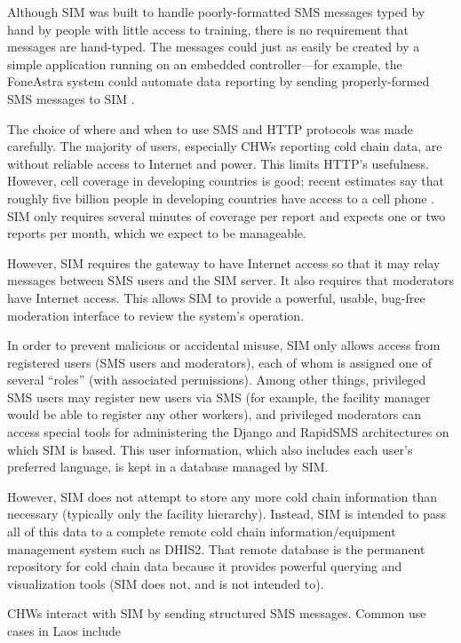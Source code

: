 \documentclass{acm_proc_article-sp}
\begin{document}
Although SIM was built to handle poorly-formatted SMS messages typed by hand by people with little access to training, there is no requirement that messages are hand-typed. The messages could just as easily be created by a simple application running on an embedded controller---for example, the FoneAstra system could automate data reporting by sending properly-formed SMS messages to SIM \cite{foneastra}.

The choice of where and when to use SMS and HTTP protocols was made carefully. The majority of users, especially CHWs reporting cold chain data, are without reliable access to Internet and power. This limits HTTP's usefulness. However, cell coverage in developing countries is good; recent estimates say that roughly five billion people in developing countries have access to a cell phone \cite{worldbank:mobileaccess}. SIM only requires several minutes of coverage per report and expects one or two reports per month, which we expect to be manageable.

However, SIM requires the gateway to have Internet access so that it may relay messages between SMS users and the SIM server. It also requires that moderators have Internet access. This allows SIM to provide a powerful, usable, bug-free moderation interface to review the system's operation.

In order to prevent malicious or accidental misuse, SIM only allows access from registered users (SMS users and moderators), each of whom is assigned one of several ``roles'' (with associated permissions). Among other things, privileged SMS users may register new users via SMS (for example, the facility manager would be able to register any other workers), and privileged moderators can access special tools for administering the Django and RapidSMS architectures on which SIM is based. This user information, which also includes each user's preferred language, is kept in a database managed by SIM.

However, SIM does not attempt to store any more cold chain information than necessary (typically only the facility hierarchy). Instead, SIM is intended to pass all of this data to a complete remote cold chain information/equipment management system such as DHIS2. That remote database is the permanent repository for cold chain data because it provides powerful querying and visualization tools (SIM does not, and is not intended to).

CHWs interact with SIM by sending structured SMS messages. Common use cases in Laos include
\end{document}
